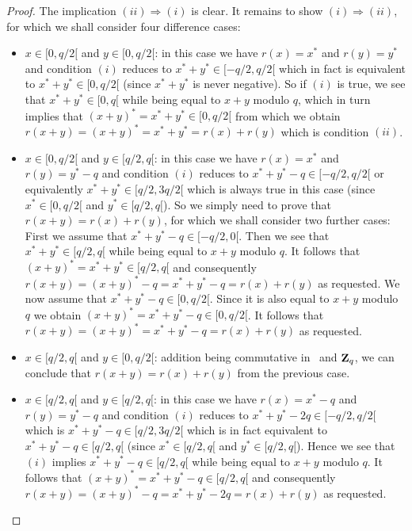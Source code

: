 \documentclass{article}
\newcommand{\zq}{\mbox{${\bf Z}_{q}$}}
\begin{document}
\begin{proof}
  The implication $(ii)\Rightarrow(i)$ is clear. It remains to show 
  $(i)\Rightarrow(ii)$, for which we shall consider four difference cases:
  \begin{itemize}
    \item $x\in[0,q/2[$ and $y\in[0,q/2[$: in this case we have $r(x)=x^{*}$
      and $r(y)=y^{*}$ and condition $(i)$ reduces to $x^{*}+y^{*}\in[-q/2,q/2[$
      which in fact is equivalent to $x^{*}+y^{*}\in[0,q/2[$ (since $x^{*}+y^{*}$
      is never negative). So if $(i)$ is true, we see that $x^{*}+y^{*}\in[0,q[$
      while being equal to $x+y$ modulo $q$, which in turn implies that 
      $(x+y)^{*}=x^{*}+y^{*}\in[0,q/2[$ from which we obtain 
      $r(x+y)=(x+y)^{*}=x^{*}+y^{*}=r(x)+r(y)$ which is condition $(ii)$. 
    \item $x\in[0,q/2[$ and $y\in[q/2,q[$: in this case we have $r(x)=x^{*}$
      and $r(y)=y^{*}-q$ and condition $(i)$ reduces to 
      $x^{*}+y^{*}-q\in[-q/2,q/2[$ or equivalently $x^{*}+y^{*}\in[q/2,3q/2[$
      which is always true in this case (since $x^{*}\in[0,q/2[$ and 
      $y^{*}\in[q/2,q[$). So we simply need to prove that $r(x+y)=r(x)+r(y)$,
      for which we shall consider two further cases: First we assume that
      $x^{*}+y^{*}-q\in[-q/2,0[$. Then we see that $x^{*}+y^{*}\in[q/2,q[$
      while being equal to $x+y$ modulo $q$. It follows that 
      $(x+y)^{*}=x^{*}+y^{*}\in[q/2,q[$ and consequently 
      $r(x+y)= (x+y)^{*}-q=x^{*}+y^{*}-q = r(x)+r(y)$ as requested.
      We now assume that $x^{*}+y^{*}-q\in[0,q/2[$. Since it is also equal
      to $x+y$ modulo $q$ we obtain $(x+y)^{*}=x^{*}+y^{*}-q\in[0,q/2[$.
      It follows that $r(x+y)=(x+y)^{*}=x^{*}+y^{*}-q = r(x)+r(y)$ as 
      requested.
    \item $x\in[q/2,q[$ and $y\in[0,q/2[$: addition being commutative
      in \Z\ and \zq, we can conclude that $r(x+y)=r(x)+r(y)$ from
      the previous case.
    \item $x\in[q/2,q[$ and $y\in[q/2,q[$: in this case we have $r(x)=x^{*}-q$
      and $r(y)=y^{*}-q$ and condition $(i)$ reduces to 
      $x^{*}+y^{*}-2q\in[-q/2,q/2[$ which is $x^{*}+y^{*}-q\in[q/2,3q/2[$
      which is in fact equivalent to $x^{*}+y^{*}-q\in[q/2,q[$ (since 
      $x^{*}\in[q/2,q[$ and $y^{*}\in[q/2,q[$). Hence we see that $(i)$ 
      implies $x^{*}+y^{*}-q\in[q/2,q[$ while being equal to $x+y$ modulo
      $q$. It follows that $(x+y)^{*}=x^{*}+y^{*}-q\in[q/2,q[$ and
      consequently $r(x+y) = (x+y)^{*}-q=x^{*}+y^{*}-2q=r(x)+r(y)$ as 
      requested.
  \end{itemize}
\end{proof}
\end{document}
